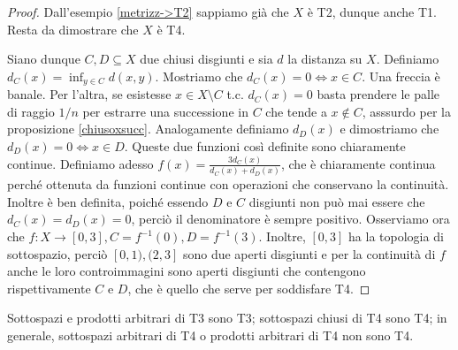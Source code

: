 \begin{proof}
  Dall'esempio \ref{metrizz->T2} sappiamo già che $X$ è T2, dunque anche T1. Resta da dimostrare che $X$ è T4.

  Siano dunque $C, D \subseteq X$ due chiusi disgiunti e sia $d$ la distanza su $X$. Definiamo $d_C(x)=\inf_{y \in C} d(x, y)$. Mostriamo che $d_C(x)=0 \Leftrightarrow x \in C$. Una freccia è banale. Per l'altra, se esistesse $x \in X \setminus C$ t.c. $d_C(x)=0$ basta prendere le palle di raggio $1/n$ per estrarre una successione in $C$ che tende a $ x \not\in C$, asssurdo per la proposizione \ref{chiusoxsucc}. Analogamente definiamo $d_D(x)$ e
  dimostriamo che $d_D(x)=0 \Leftrightarrow x \in D$. Queste due funzioni così definite sono chiaramente continue. Definiamo adesso $\displaystyle f(x)=\frac{3d_C(x)}{d_C(x)+d_D(x)}$, che è chiaramente continua perché ottenuta da funzioni continue con operazioni che conservano la continuità. Inoltre è ben definita, poiché essendo $D$ e $C$ disgiunti non può mai essere che $d_C(x)=d_D(x)=0$, perciò il denominatore è sempre positivo. Osserviamo ora che $f:X \rightarrow [0, 3], C=f^{-1}(0), D=f^{-1}(3)$. Inoltre, $[0, 3]$ ha la topologia di sottospazio, perciò $[0, 1), (2, 3]$ sono due aperti disgiunti e per la continuità di $f$ anche le loro controimmagini sono aperti disgiunti che contengono rispettivamente $C$ e $D$, che è quello che serve per soddisfare T4.
\end{proof}

\begin{prop}
  Sottospazi e prodotti arbitrari di T3 sono T3; sottospazi chiusi di T4 sono T4; in generale, sottospazi arbitrari di T4 o prodotti arbitrari di T4 non sono T4.
\end{prop}

